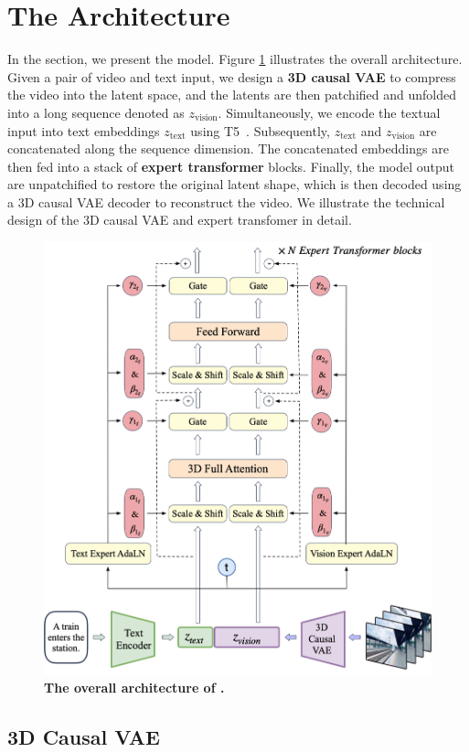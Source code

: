 \section{The \model Architecture}\label{sec:model}


In the section, we present the \model model. 
Figure \ref{fig:model} illustrates the overall architecture. 
Given a pair of video and text input,  we design a \textbf{3D causal VAE} to compress the video into the latent space, and the latents are then patchified and unfolded into a long sequence denoted as $z_{\text{vision}}$. 
Simultaneously, we encode the textual input into text embeddings $z_{\text{text}}$ using T5~\citep{raffel2020exploring}. 
Subsequently, $z_{\text{text}}$ and $z_{\text{vision}}$ are concatenated along the sequence dimension. 
The concatenated embeddings are then fed into a stack of \textbf{expert transformer} blocks.
Finally, the model output are unpatchified to restore the original latent shape, which is then decoded using a 3D causal VAE decoder to reconstruct the video. 
We illustrate the technical design of the 3D causal VAE and expert transfomer in detail.


\begin{figure}[h]
\begin{center}
\includegraphics[width=0.7\linewidth]{images/transformer.png}
\end{center}
\caption{\textbf{The overall architecture of \model.} }
\label{fig:model}
\end{figure}



\subsection{3D Causal VAE} 

